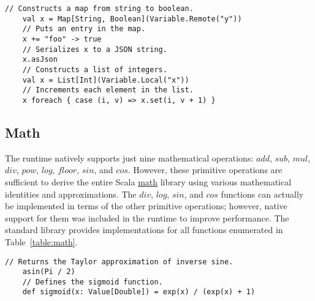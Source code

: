 \documentclass[../main.tex]{subfiles}
\begin{document}
  \begin{lstlisting}[style=Scala]
    // Constructs a map from string to boolean.
    val x = Map[String, Boolean](Variable.Remote("y"))
    // Puts an entry in the map.
    x += "foo" -> true
    // Serializes x to a JSON string.
    x.asJson
    // Constructs a list of integers.
    val x = List[Int](Variable.Local("x"))
    // Increments each element in the list.
    x foreach { case (i, v) => x.set(i, v + 1) }
  \end{lstlisting}

  \subsection{Math}
  The runtime natively supports just nine mathematical operations: $add$, $sub$, $mul$, $div$,
  $pow$, $log$, $floor$, $sin$, and $cos$. However, these primitive operations are sufficient to
  derive the entire Scala \href{https://www.scala-lang.org/api/2.12.1/scala/math/index.html}{math}
  library using various mathematical identities and approximations. The $div$, $log$, $sin$, and
  $cos$ functions can actually be implemented in terms of the other primitive operations; however,
  native support for them was included in the runtime to improve performance. The standard library
  provides implementations for all functions enumerated in Table~\ref{table:math}.

  \begin{lstlisting}[style=Scala]
    // Returns the Taylor approximation of inverse sine.
    asin(Pi / 2)
    // Defines the sigmoid function.
    def sigmoid(x: Value[Double]) = exp(x) / (exp(x) + 1)
  \end{lstlisting}
\end{document}
